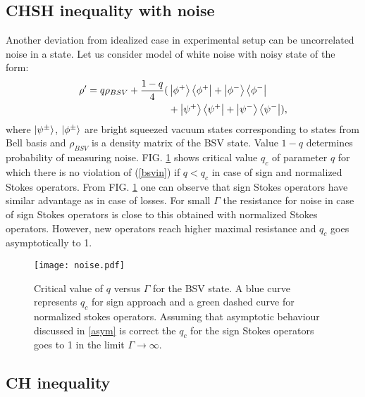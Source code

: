 \documentclass[aps,pra, twocolumn, showpacs]{revtex4-2}
\begin{document}
\subsection{CHSH inequality with noise}
Another deviation from idealized case in experimental setup can be uncorrelated noise in a state. Let us consider model of white noise with noisy state of the form:
\begin{align}
\begin{split}
\rho'=q\rho_{BSV}+\frac{1-q}{4}(&\ket{\phi^+}\bra{\phi^+}+\ket{\phi^-}\bra{\phi^-}\\
&+\ket{\psi^+}\bra{\psi^+}+\ket{\psi^-}\bra{\psi^-}),
\end{split}
\end{align}
where $\ket{\psi^\pm}$, $\ket{\phi^\pm}$ are bright squeezed vacuum states corresponding to states from Bell basis and $\rho_{BSV}$ is a density matrix of the BSV state. Value $1-q$ determines probability of measuring noise. FIG. \ref{bsvnoise} shows critical value $q_c$ of parameter $q$ for which there is no violation of (\ref{bsvin}) if $q<q_c$ in case of sign and normalized Stokes operators. From FIG. \ref{bsvnoise} one can observe that sign Stokes operators have similar advantage as in case of losses. For small $\Gamma$ the resistance for noise in case of sign Stokes operators is close to this obtained with normalized Stokes operators. However, new operators reach higher maximal resistance and $q_c$ goes asymptotically to 1. 
\begin{figure}[h!]
\centering
\texttt{[image: noise.pdf]} 
\caption{Critical value of $q$ versus $\Gamma$ for the BSV state. A blue curve represents $q_c$ for sign approach and a green dashed curve for normalized stokes operators. Assuming that asymptotic behaviour discussed in \ref{asym} is correct the $q_c$ for the sign Stokes operators goes to 1 in the limit $\Gamma\rightarrow\infty$. }
\label{bsvnoise}
\end{figure}



\subsection{CH inequality}
\end{document}

